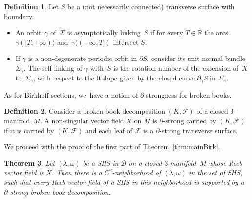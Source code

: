 \documentclass[10pt]{amsart}
\newcommand{\threemanifold}{$3$\nobreakdash-mani\-fold\xspace}
\newtheorem{theorem}{Theorem}[section]
\theoremstyle{definition}
\newtheorem{defi}[theorem]{Definition}
\newcommand\R{\mathbb{R}}
\begin{document}
\begin{defi}
Let $S$ be a (not necessarily connected)
transverse surface with boundary.
\begin{itemize}
\item
An orbit~$\gamma$ of~$X$ is asymptotically linking~$S$ if for every $T\in\R$ the arcs $\gamma([T, +\infty))$ and~$\gamma((-\infty, T])$ intersect $S$.

\item
If $\gamma$ is a non-degenerate periodic orbit in $\partial S$, consider its unit normal bundle~$\Sigma_\gamma$. The self-linking of $\gamma$ with~$S$ is the rotation number of the extension of~$X$ to~$\Sigma_\gamma$, with respect to the 0-slope given by the closed curve $\partial_\gamma S$ in $\Sigma_\gamma$.
\end{itemize}

\end{defi}

As for Birkhoff sections, we~have a notion of $\partial$-strongness for broken books.

\begin{defi}\label{defn-bbddelta}
Consider a broken book decomposition $(K,\mathcal{F})$ of a closed \threemanifold~$M$. A non-singular vector field $X$ on $M$ is $\partial$-strong carried by $(K,\mathcal{F})$ if it is carried by $(K,\mathcal{F})$ and each leaf of $\mathcal{F}$ is a $\partial$-strong transverse surface.
\end{defi}

We proceed with the proof of the first part of Theorem~\ref{thm:mainBirk}.

\begin{theorem}\label{thm:bbook}
Let $(\lambda,\omega)$ be a SHS in $\mathcal{B}$ on a closed \threemanifold~$M$ whose Reeb vector field is $X$. Then there is a $C^2$-neighborhood of $(\lambda,\omega)$ in the set of SHS, such that every Reeb vector field of a SHS in this neighborhood is supported by a $\partial$-strong broken book decomposition.
\end{theorem}
\end{document}
